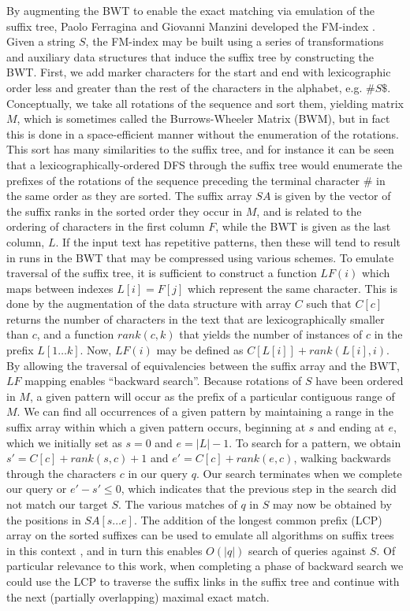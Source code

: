 By augmenting the BWT to enable the exact matching via emulation of the suffix tree, Paolo Ferragina and Giovanni Manzini developed the FM-index \cite{ferragina2000opportunistic,ferragina2004alphabet}.
Given a string $S$, the FM-index may be built using a series of transformations and auxiliary data structures that induce the suffix tree by constructing the BWT.
First, we add marker characters for the start and end with lexicographic order less and greater than the rest of the characters in the alphabet, e.g. $\#S\$$.
Conceptually, we take all rotations of the sequence and sort them, yielding matrix $M$, which is sometimes called the Burrows-Wheeler Matrix (BWM), but in fact this is done in a space-efficient manner without the enumeration of the rotations.
This sort has many similarities to the suffix tree, and for instance it can be seen that a lexicographically-ordered DFS through the suffix tree would enumerate the prefixes of the rotations of the sequence preceding the terminal character $\#$ in the same order as they are sorted.
The suffix array $SA$ is given by the vector of the suffix ranks in the sorted order they occur in $M$, and is related to the ordering of characters in the first column $F$, while the BWT is given as the last column, $L$.
If the input text has repetitive patterns, then these will tend to result in runs in the BWT that may be compressed using various schemes.
To emulate traversal of the suffix tree, it is sufficient to construct a function $LF(i)$ which maps between indexes $L[i] = F[j]$ which represent the same character.
This is done by the augmentation of the data structure with array $C$ such that $C[c]$ returns the number of characters in the text that are lexicographically smaller than $c$, and a function $rank(c,k)$ that yields the number of instances of $c$ in the prefix $L[1 \ldots k]$.
Now, $LF(i)$ may be defined as $C[L[i]] + rank(L[i], i)$.
By allowing the traversal of equivalencies between the suffix array and the BWT, $LF$ mapping enables ``backward search''.
Because rotations of $S$ have been ordered in $M$, a given pattern will occur as the prefix of a particular contiguous range of $M$.
We can find all occurrences of a given pattern by maintaining a range in the suffix array within which a given pattern occurs, beginning at $s$ and ending at $e$, which we initially set as $s=0$ and $e=|L|-1$.
To search for a pattern, we obtain $s' = C[c] + rank(s,c) + 1$ and $e' = C[c] + rank(e,c)$, walking backwards through the characters $c$ in our query $q$.
Our search terminates when we complete our query or $e' - s' \leq 0$, which indicates that the previous step in the search did not match our target $S$.
The various matches of $q$ in $S$ may now be obtained by the positions in $SA[s \ldots e]$.
The addition of the longest common prefix (LCP) array on the sorted suffixes can be used to emulate all algorithms on suffix trees in this context \cite{abouelhoda2004replacing}, and in turn this enables $O(|q|)$ search of queries against $S$.
Of particular relevance to this work, when completing a phase of backward search we could use the LCP to traverse the suffix links in the suffix tree and continue with the next (partially overlapping) maximal exact match.

